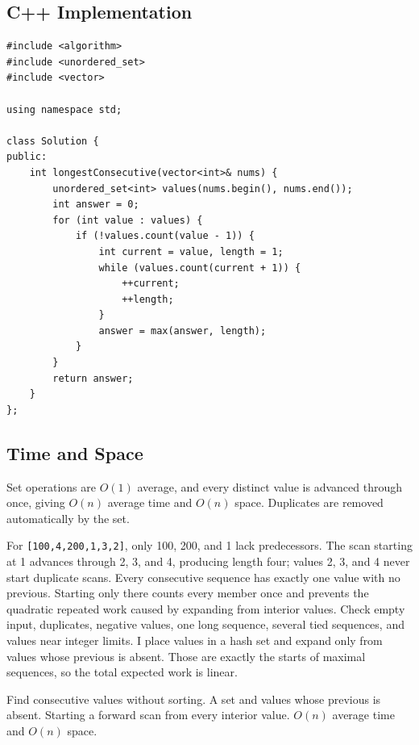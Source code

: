 \subsection{C++ Implementation}
\begin{lstlisting}[style=compactcode,caption={Complete C++ solution: Longest Consecutive Sequence}]
#include <algorithm>
#include <unordered_set>
#include <vector>

using namespace std;

class Solution {
public:
    int longestConsecutive(vector<int>& nums) {
        unordered_set<int> values(nums.begin(), nums.end());
        int answer = 0;
        for (int value : values) {
            if (!values.count(value - 1)) {
                int current = value, length = 1;
                while (values.count(current + 1)) {
                    ++current;
                    ++length;
                }
                answer = max(answer, length);
            }
        }
        return answer;
    }
};
\end{lstlisting}

\subsection{Time and Space}
Set operations are \(O(1)\) average, and every distinct value is advanced
through once, giving \(O(n)\) average time and \(O(n)\) space. Duplicates are
removed automatically by the set.

\lessonexpansion
  {For \texttt{[100,4,200,1,3,2]}, only 100, 200, and 1 lack predecessors.
   The scan starting at 1 advances through 2, 3, and 4, producing length four;
   values 2, 3, and 4 never start duplicate scans.}
  {Every consecutive sequence has exactly one value with no previous.
   Starting only there counts every member once and prevents the quadratic
   repeated work caused by expanding from interior values.}
  {Check empty input, duplicates, negative values, one long sequence, several
   tied sequences, and values near integer limits.}
  {I place values in a hash set and expand only from values whose previous
   is absent. Those are exactly the starts of maximal sequences, so the
   total expected work is linear.}

\chaptercheckpoint
  {Find consecutive values without sorting.}
  {A set and values whose previous is absent.}
  {Starting a forward scan from every interior value.}
  {$O(n)$ average time and $O(n)$ space.}



